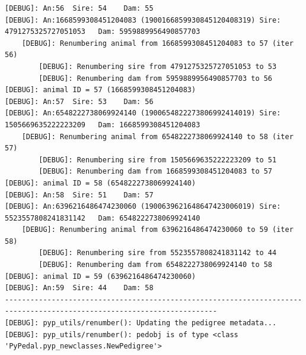 \documentclass[
  letterpaper,
  DIV=11,
  numbers=noendperiod]{scrreprt}
\begin{document}
\begin{codelisting}
{\begin{verbatim}
[DEBUG]: An:56  Sire: 54    Dam: 55
[DEBUG]: An:1668599308451204083 (1900166859930845120408319) Sire: 4791275325727051053   Dam: 5959889956490857703
    [DEBUG]: Renumbering animal from 1668599308451204083 to 57 (iter 56)
        [DEBUG]: Renumbering sire from 4791275325727051053 to 53
        [DEBUG]: Renumbering dam from 5959889956490857703 to 56
[DEBUG]: animal ID = 57 (1668599308451204083)
[DEBUG]: An:57  Sire: 53    Dam: 56
[DEBUG]: An:6548222738069924140 (1900654822273806992414019) Sire: 1505669635222223209   Dam: 1668599308451204083
    [DEBUG]: Renumbering animal from 6548222738069924140 to 58 (iter 57)
        [DEBUG]: Renumbering sire from 1505669635222223209 to 51
        [DEBUG]: Renumbering dam from 1668599308451204083 to 57
[DEBUG]: animal ID = 58 (6548222738069924140)
[DEBUG]: An:58  Sire: 51    Dam: 57
[DEBUG]: An:6396216486474230060 (1900639621648647423006019) Sire: 5523557808241831142   Dam: 6548222738069924140
    [DEBUG]: Renumbering animal from 6396216486474230060 to 59 (iter 58)
        [DEBUG]: Renumbering sire from 5523557808241831142 to 44
        [DEBUG]: Renumbering dam from 6548222738069924140 to 58
[DEBUG]: animal ID = 59 (6396216486474230060)
[DEBUG]: An:59  Sire: 44    Dam: 58
------------------------------------------------------------------------------------------------------------------------
[DEBUG]: pyp_utils/renumber(): Updating the pedigree metadata...
[DEBUG]: pyp_utils/renumber(): pedobj is of type <class 'PyPedal.pyp_newclasses.NewPedigree'>

\end{verbatim}}
\end{codelisting}
\end{document}

